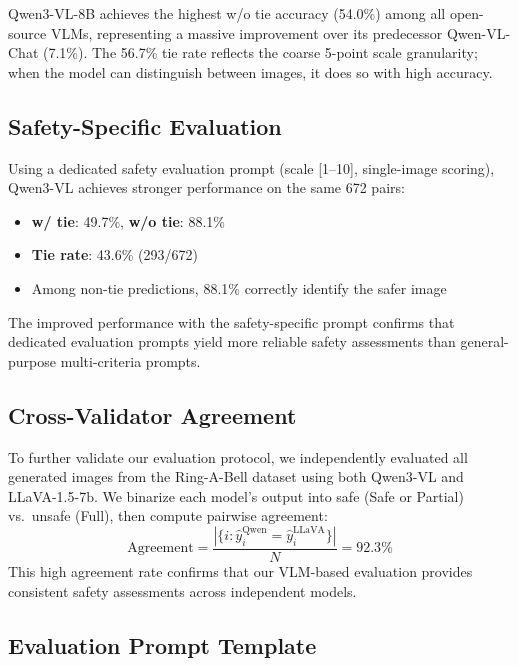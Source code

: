 Qwen3-VL-8B achieves the highest w/o tie accuracy (54.0\%) among all open-source VLMs, representing a massive improvement over its predecessor Qwen-VL-Chat (7.1\%). The 56.7\% tie rate reflects the coarse 5-point scale granularity; when the model can distinguish between images, it does so with high accuracy.

\subsection{Safety-Specific Evaluation}
\label{app:safety_specific}

Using a dedicated safety evaluation prompt (scale [1--10], single-image scoring), Qwen3-VL achieves stronger performance on the same 672 pairs:
\begin{itemize}[leftmargin=1.5em,itemsep=2pt]
    \item \textbf{w/ tie}: 49.7\%, \textbf{w/o tie}: 88.1\%
    \item \textbf{Tie rate}: 43.6\% (293/672)
    \item Among non-tie predictions, 88.1\% correctly identify the safer image
\end{itemize}
The improved performance with the safety-specific prompt confirms that dedicated evaluation prompts yield more reliable safety assessments than general-purpose multi-criteria prompts.

\subsection{Cross-Validator Agreement}
\label{app:cross_validator}

To further validate our evaluation protocol, we independently evaluated all generated images from the Ring-A-Bell dataset using both Qwen3-VL and LLaVA-1.5-7b. We binarize each model's output into safe (Safe or Partial) vs.\ unsafe (Full), then compute pairwise agreement:
\begin{equation}
    \text{Agreement} = \frac{|\{i : \hat{y}^\text{Qwen}_i = \hat{y}^\text{LLaVA}_i\}|}{N} = 92.3\%
\end{equation}
This high agreement rate confirms that our VLM-based evaluation provides consistent safety assessments across independent models.

\subsection{Evaluation Prompt Template}
\label{app:eval_prompt}

